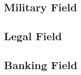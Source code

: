 \subsection{Military Field}
\label{subsec:military}
\newline

\subsection{Legal Field}
\label{subsec:legal}
\newline

\subsection{Banking Field}
\label{subsec:banking}
\newline